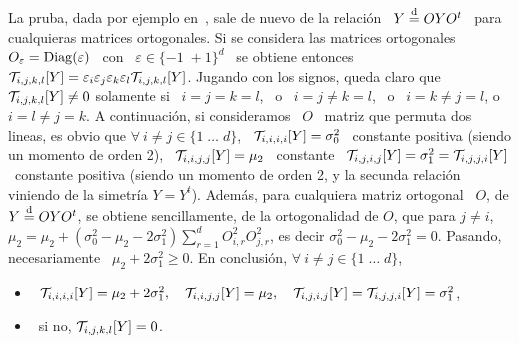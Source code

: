 \begin{itemize}
\begin{itemize}
  La pruba,  dada por ejemplo  en~\cite[\S~13.2]{BilBre99}, sale de nuevo  de la
  relaci\'on \ $Y  \stackrel{\mathrm{d}}{=} O Y O^t$ \ para cualquieras  matrices ortogonales. Si se
  considera las  matrices ortogonales  \ $O_\varepsilon =  \operatorname{Diag}(\varepsilon)$ \
  con  \  $\varepsilon  \in  \{-1  \;   +  1  \}^d$  \  se  obtiene  entonces  \
  $\mathcal{T}_{i,j,k,l}[Y]  =  \varepsilon_i  \varepsilon_j \varepsilon_k  \varepsilon_l
  \mathcal{T}_{i,j,k,l}[Y]$.  Jugando  con los  signos, queda claro  que $\mathcal{T}_{i,j,k,l}[Y]
  \ne 0$ solamente si \ $i =  j = k = l$, \ o \ $i = j \ne k  = l$, \ o \ $i = k
  \ne j = l$, o \ $i = l  \ne j = k$.  A continuaci\'on, si consideramos \ $O$ \
  matriz que permuta  dos lineas, es obvio que  $\forall \: i \ne j \in  \{ 1 \;
  \ldots \; d\}$, \ $\mathcal{T}_{i,i,i,i}[Y]  = \sigma_0^2$ \ constante positiva (siendo
  un  momento  de   orden  2),  \  $\mathcal{T}_{i,i,j,j}[Y]  =   \mu_2$  \  constante  \
  $\mathcal{T}_{i,j,i,j}[Y] = \sigma_1^2 =  \mathcal{T}_{i,j,j,i}[Y]$ \ constante positiva (siendo
  un momento de orden 2, y la  secunda relaci\'on viniendo de la simetr\'ia $Y =
  Y^t$).  Adem\'as,  para cualquiera  matriz ortogonal  \ $O$, de  $Y \stackrel{\mathrm{d}}{=}  O Y
  O^t$, se  obtiene sencillamente, de la  ortogonalidad de $O$, que  para $j \ne
  i$, $\displaystyle  \mu_2 = \mu_2 +  \left( \sigma_0^2 - \mu_2  - 2 \sigma_1^2
  \right) \sum_{r=1}^d  O_{i,r}^2 O_{j,r}^2$, es  decir $\sigma_0^2 - \mu_2  - 2
  \sigma_1^2 = 0$. Pasando, necesariamente \ $\mu_2 + 2 \sigma_1^2 \ge 0$.
   En  conclusi\'on, $\forall \: i \ne j \in \{ 1 \; \ldots \; d \}$,
  \begin{itemize}
  \item  \ $\mathcal{T}_{i,i,i,i}[Y]  = \mu_2  +  2 \sigma_1^2,  \quad \mathcal{T}_{i,i,j,j}[Y]  =
    \mu_2, \quad \mathcal{T}_{i,j,i,j}[Y] = \mathcal{T}_{i,j,j,i}[Y] = \sigma_1^2$,
  \item \ si no, $\mathcal{T}_{i,j,k,l}[Y] = 0$.
  \end{itemize}

\end{itemize}
\end{itemize}
